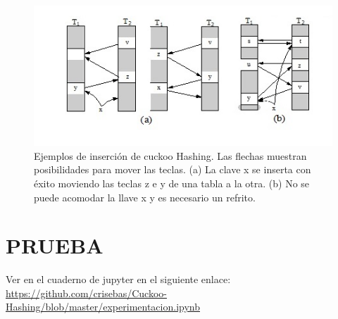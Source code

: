 \documentclass[final,a4paper,twocolumn,romanappendices]{IEEEtran}
\begin{document}
\begin{algorithm}
\caption{ funcion{\textunderscore}hash(funcion,clave) \label{ALG1_1}}
\end{algorithm}
\begin{algorithm}
	\caption{ Colocar( clave, tabla, cont, n) \label{ALG1_2}}
\end{algorithm}

\begin{figure}[h!]
\centering
\includegraphics[scale=0.8]{hash_cuco.jpg}
\caption{ Ejemplos de inserci\'on de cuckoo Hashing. Las flechas muestran posibilidades para mover las teclas. (a) La clave x se inserta con éxito moviendo las teclas z e y de una tabla a la otra. (b) No se puede acomodar la llave x y es necesario un refrito.}
\label{fig 1}
\end{figure}
\section{PRUEBA}
Ver en el cuaderno de jupyter en el siguiente enlace:  \url{https://github.com/crisebas/Cuckoo-Hashing/blob/master/experimentacion.ipynb}
\end{document}
